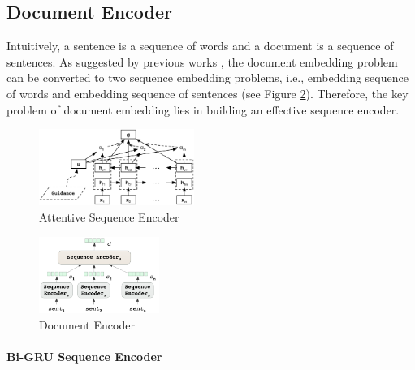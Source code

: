 \subsection{Document Encoder}
Intuitively, a sentence is a sequence of words and a document is a sequence of sentences. As suggested by previous works \cite{tang2015document,yang2016hierarchical}, the document embedding problem can be converted to two sequence embedding problems, i.e., embedding sequence of words and embedding sequence of sentences (see Figure \ref{fig_doc_encoder}). Therefore, the key problem of document embedding lies in building an effective sequence encoder. 

\begin{figure}[htbp]
\begin{center}
\includegraphics[width=0.45\textwidth]{figures/attentive_seq_encoder.png}	
\caption{Attentive Sequence Encoder}
\label{fig_seq_encoder}
\end{center}
\end{figure}

\begin{figure}[htbp]
\begin{center}
\includegraphics[width=0.35\textwidth]{figures/document_encoder.png}	
\caption{Document Encoder}
\label{fig_doc_encoder}
\end{center}
\end{figure}

\paragraph{Bi-GRU Sequence Encoder} 



